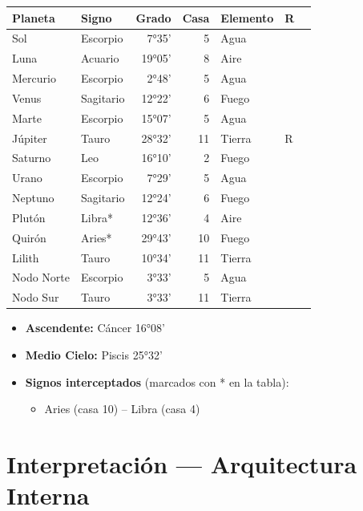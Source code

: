 \documentclass[11pt,a4paper]{article}\usepackage[utf8]{inputenc}
\begin{document}
\begin{center}
\begin{tabular}{llrrlll}
  \toprule
  \textbf{Planeta} & \textbf{Signo} & \textbf{Grado} & \textbf{Casa} &
  \textbf{Elemento} & \textbf{R} \\
  \midrule
  Sol & Escorpio & 7°35' & 5 & Agua &  \\
  Luna & Acuario & 19°05' & 8 & Aire &  \\
  Mercurio & Escorpio & 2°48' & 5 & Agua &  \\
  Venus & Sagitario & 12°22' & 6 & Fuego &  \\
  Marte & Escorpio & 15°07' & 5 & Agua &  \\
  Júpiter & Tauro & 28°32' & 11 & Tierra & R \\
  Saturno & Leo & 16°10' & 2 & Fuego &  \\
  Urano & Escorpio & 7°29' & 5 & Agua &  \\
  Neptuno & Sagitario & 12°24' & 6 & Fuego &  \\
  Plutón & Libra* & 12°36' & 4 & Aire &  \\
  Quirón & Aries* & 29°43' & 10 & Fuego &  \\
  Lilith & Tauro & 10°34' & 11 & Tierra &  \\
  Nodo Norte & Escorpio & 3°33' & 5 & Agua &  \\
  Nodo Sur & Tauro & 3°33' & 11 & Tierra &  \\
  \bottomrule
\end{tabular}
\end{center}

\vspace{0.5cm}
\begin{itemize}
  \item \textbf{Ascendente:} Cáncer 16°08'
  \item \textbf{Medio Cielo:} Piscis 25°32'
  \item \textbf{Signos interceptados} (marcados con * en la tabla):
  \begin{itemize}
  \item Aries (casa 10) -- Libra (casa 4)
  \end{itemize}
\end{itemize}

\newpage

\section{Interpretación — Arquitectura Interna}
\end{document}
